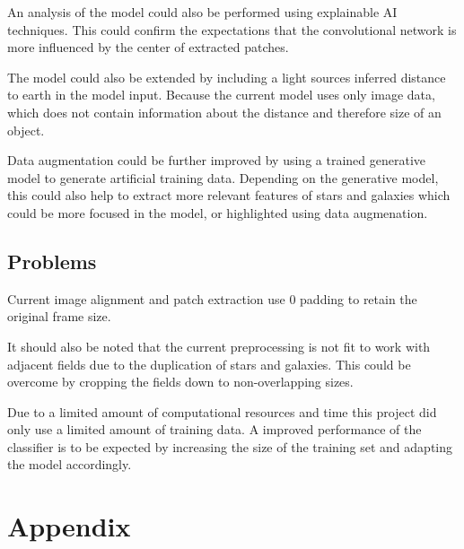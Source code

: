 \documentclass[
a4paper,     %
10pt         %
]{scrartcl}  %
\begin{document}
An analysis of the model could also be performed using explainable AI techniques.
This could confirm the expectations that the convolutional network is more influenced by the center of extracted patches.

The model could also be extended by including a light sources inferred distance to earth in the model input.
Because the current model uses only image data, which does not contain information about the distance and therefore size of an object.

Data augmentation could be further improved by using a trained generative model to generate artificial training data.
Depending on the generative model, this could also help to extract more relevant features of stars and galaxies which could be more focused in the model, or highlighted using data augmenation.


\subsection{Problems}
Current image alignment and patch extraction use $0$ padding to retain the original frame size.

It should also be noted that the current preprocessing is not fit to work with adjacent fields due to the duplication of stars and galaxies.
This could be overcome by cropping the fields down to non-overlapping sizes.

Due to a limited amount of computational resources and time this project did only use a limited amount of training data.
A improved performance of the classifier is to be expected by increasing the size of the training set and adapting the model accordingly.
\pagebreak
\section{Appendix}
\label{sec:appendix}
\end{document}
